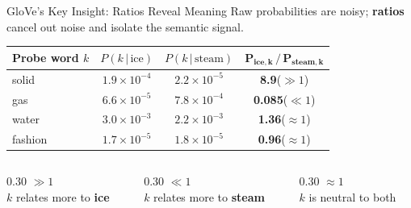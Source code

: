 \documentclass[11pt,aspectratio=169,professionalfonts]{beamer}
\begin{document}
%
%
\begin{frame}{GloVe's Key Insight: Ratios Reveal Meaning}
  Raw probabilities are noisy; \textbf{ratios} cancel out noise and isolate the semantic signal.

  \vspace{.5cm}
  \centering
  \normalsize
  \begin{tabular}{l c c c}
    \toprule
    \textbf{Probe word $k$}
      & $P(k\,|\,\text{ice})$
      & $P(k\,|\,\text{steam})$
      & $\bm{P_{\text{ice},k}\,/\,P_{\text{steam},k}}$ \\
    \midrule
    solid   & $1.9\times10^{-4}$ & $2.2\times10^{-5}$ & \textbf{8.9}\quad ($\gg 1$) \\
    gas     & $6.6\times10^{-5}$ & $7.8\times10^{-4}$ & \textbf{0.085}\quad ($\ll 1$) \\
    water   & $3.0\times10^{-3}$ & $2.2\times10^{-3}$ & \textbf{1.36}\quad ($\approx 1$) \\
    fashion & $1.7\times10^{-5}$ & $1.8\times10^{-5}$ & \textbf{0.96}\quad ($\approx 1$) \\
    \bottomrule
  \end{tabular}

  \vspace{.5cm}
  \begin{columns}[c]
    \begin{column}{0.30\textwidth}
      \centering
      {\Large $\gg 1$}\\[3pt]
      {\small $k$ relates more to \textbf{ice}}
    \end{column}
    \begin{column}{0.30\textwidth}
      \centering
      {\Large $\ll 1$}\\[3pt]
      {\small $k$ relates more to \textbf{steam}}
    \end{column}
    \begin{column}{0.30\textwidth}
      \centering
      {\Large $\approx 1$}\\[3pt]
      {\small $k$ is neutral to both}
    \end{column}
  \end{columns}
\end{frame}
%
%
\end{document}
